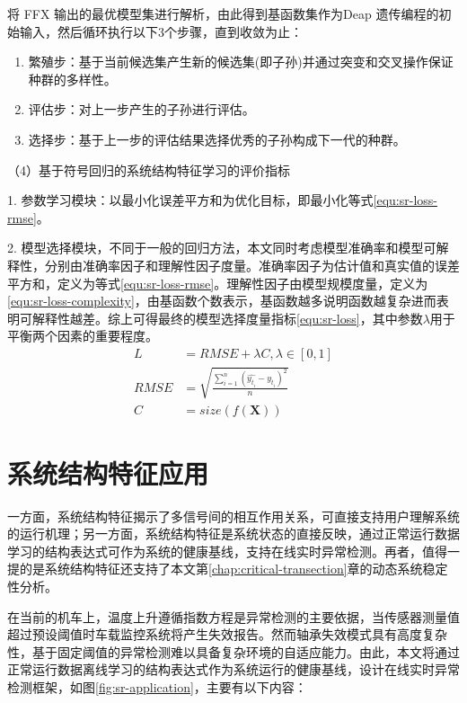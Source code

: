 将 FFX 输出的最优模型集进行解析，由此得到基函数集作为Deap 遗传编程的初始输入，然后循环执行以下3个步骤，直到收敛为止：
\begin{enumerate}[1.]
      \item 繁殖步：基于当前候选集产生新的候选集(即子孙)并通过突变和交叉操作保证种群的多样性。
      \item 评估步：对上一步产生的子孙进行评估。
      \item 选择步：基于上一步的评估结果选择优秀的子孙构成下一代的种群。
\end{enumerate}

（4）基于符号回归的系统结构特征学习的评价指标

1. 参数学习模块：以最小化误差平方和为优化目标，即最小化等式\ref{equ:sr-loss-rmse}。

2. 模型选择模块，不同于一般的回归方法，本文同时考虑模型准确率和模型可解释性，分别由准确率因子和理解性因子度量。准确率因子为估计值和真实值的误差平方和，定义为等式\ref{equ:sr-loss-rmse}。理解性因子由模型规模度量，定义为\ref{equ:sr-loss-complexity}，由基函数个数表示，基函数越多说明函数越复杂进而表明可解释性越差。综上可得最终的模型选择度量指标\ref{equ:sr-loss}，其中参数$\lambda$用于平衡两个因素的重要程度。
\begin{subequations}
\begin{align}
L &= RMSE + \lambda C \label{equ:sr-loss} , \lambda \in [0,1]\\
RMSE &= \sqrt{\frac{\sum_{i=1}^{n} (\hat{y_{t_{i}}} - y_{t_{i}})^{2}}{n} } \label{equ:sr-loss-rmse} \\
C &= size(f(\mathbf{X})) \label{equ:sr-loss-complexity}
\end{align}
\end{subequations}

\section{系统结构特征应用}
\label{sec:sr-application}

一方面，系统结构特征揭示了多信号间的相互作用关系，可直接支持用户理解系统的运行机理；另一方面，系统结构特征是系统状态的直接反映，通过正常运行数据学习的结构表达式可作为系统的健康基线，支持在线实时异常检测。再者，值得一提的是系统结构特征还支持了本文第\ref{chap:critical-transection}章的动态系统稳定性分析。

在当前的机车上，温度上升遵循指数方程是异常检测的主要依据，当传感器测量值超过预设阈值时车载监控系统将产生失效报告。然而轴承失效模式具有高度复杂性，基于固定阈值的异常检测难以具备复杂环境的自适应能力。由此，本文将通过正常运行数据离线学习的结构表达式作为系统运行的健康基线，设计在线实时异常检测框架，如图\ref{fig:sr-application}，主要有以下内容：

